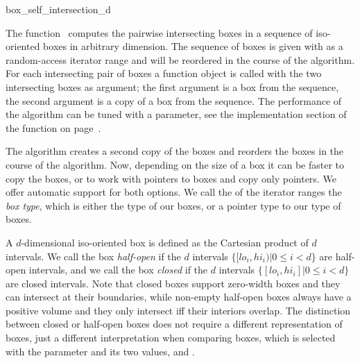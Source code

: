 

\begin{ccRefFunction}{box_self_intersection_d}

\ccDefinition
  
The function \ccRefName\ computes the pairwise intersecting boxes
in a sequence of iso-oriented boxes in arbitrary dimension.
The sequence of boxes is given with as a random-access iterator
range and will be reordered in the course of the algorithm. For each
intersecting pair of boxes a  function object is called
with the two intersecting boxes as argument; the first argument is a
box from the sequence, the second argument is a copy of a box from the
sequence.  The performance of the algorithm can be tuned with a
 parameter, see the implementation section of the
 function on
page~. 

The algorithm creates a second copy of the boxes and reorders the
boxes in the course of the algorithm. Now, depending on the size of a
box it can be faster to copy the boxes, or to work with pointers to
boxes and copy only pointers. We offer automatic support for both
options. We call the  of the iterator ranges the
\emph{box type}, which is either the type of our boxes, or a pointer
type to our type of boxes.

A $d$-dimensional iso-oriented box is defined as the Cartesian product
of $d$ intervals. We call the box \emph{half-open} if the $d$
intervals $\{ [lo_i,hi_i) | 0 \leq i < d\}$ are half-open intervals,
and we call the box \emph{closed} if the $d$ intervals $\{ [lo_i,hi_i]
| 0 \leq i < d\}$ are closed intervals. Note that closed boxes support
zero-width boxes and they can intersect at their boundaries, while
non-empty half-open boxes always have a positive volume and they only
intersect iff their interiors overlap.  The distinction between closed
or half-open boxes does not require a different representation of
boxes, just a different interpretation when comparing boxes, which is
selected with the  parameter and its two values,
 and
.


\end{ccRefFunction}
